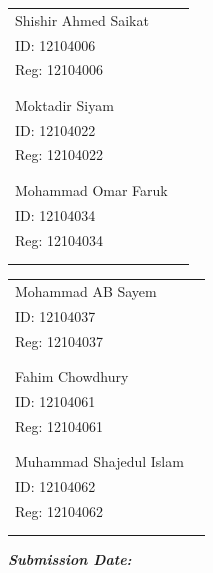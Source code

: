 \documentclass[12pt,a4paper]{article}
\begin{document}
	\begin{multicols}{2}
	\centering
	\hspace{10cm}
		\begin{tabular}{ll}
		Shishir Ahmed Saikat \\
		ID: 12104006 \\
		Reg: 12104006 \\ \\\\ 
		
		
		Moktadir Siyam \\
		ID: 12104022 \\
		Reg: 12104022 \\ \\\\ 
		
		Mohammad Omar Faruk \\
		ID: 12104034 \\
		Reg: 12104034 \\ \\\\ 
		
	\end{tabular}
	
	\hspace{10cm}
	 \begin{tabular}{ll}
	Mohammad AB Sayem \\
	ID: 12104037 \\
	Reg: 12104037 \\ \\\\ 
	
	
	Fahim Chowdhury \\
	ID: 12104061 \\
	Reg: 12104061 \\ \\\\ 
	
	Muhammad Shajedul Islam \\
	ID: 12104062 \\
	Reg: 12104062 \\ \\\\ 
	
\end{tabular}
\end{multicols}

\vspace{2cm}

 \hspace{8cm} \LARGE\textbf{\textit{Submission Date:}} \date{}
	
\end{document}
